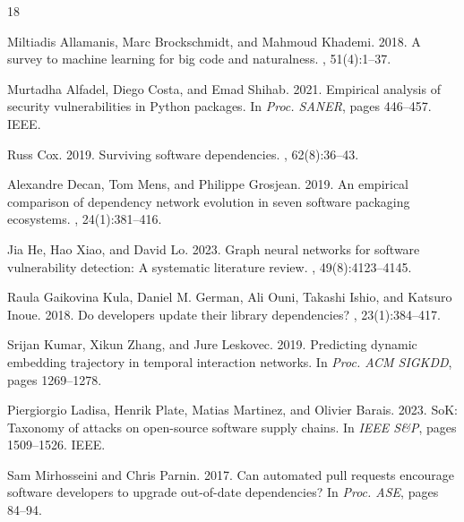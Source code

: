 \documentclass[sigconf,screen]{acmart}
\begin{document}

\renewcommand{\bibfont}{\footnotesize}
\begin{thebibliography}{18}
\footnotesize
\setlength{\itemsep}{2.5pt plus 0.5pt}
\setlength{\parsep}{0pt}

Miltiadis Allamanis, Marc Brockschmidt, and Mahmoud Khademi. 2018.
\newblock A survey to machine learning for big code and naturalness.
, 51(4):1--37.

Murtadha Alfadel, Diego Costa, and Emad Shihab. 2021.
\newblock Empirical analysis of security vulnerabilities in Python packages.
\newblock In {\em Proc. SANER}, pages 446--457. IEEE.

Russ Cox. 2019.
\newblock Surviving software dependencies.
, 62(8):36--43.

Alexandre Decan, Tom Mens, and Philippe Grosjean. 2019.
\newblock An empirical comparison of dependency network evolution in seven software packaging ecosystems.
, 24(1):381--416.

Jia He, Hao Xiao, and David Lo. 2023.
\newblock Graph neural networks for software vulnerability detection: A systematic literature review.
, 49(8):4123--4145.

Raula Gaikovina Kula, Daniel M. German, Ali Ouni, Takashi Ishio, and Katsuro Inoue. 2018.
\newblock Do developers update their library dependencies?
, 23(1):384--417.

Srijan Kumar, Xikun Zhang, and Jure Leskovec. 2019.
\newblock Predicting dynamic embedding trajectory in temporal interaction networks.
\newblock In {\em Proc. ACM SIGKDD}, pages 1269--1278.

Piergiorgio Ladisa, Henrik Plate, Matias Martinez, and Olivier Barais. 2023.
\newblock SoK: Taxonomy of attacks on open-source software supply chains.
\newblock In {\em IEEE S\&P}, pages 1509--1526. IEEE.

Sam Mirhosseini and Chris Parnin. 2017.
\newblock Can automated pull requests encourage software developers to upgrade out-of-date dependencies?
\newblock In {\em Proc. ASE}, pages 84--94.


\end{thebibliography}
\end{document}
